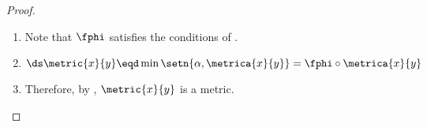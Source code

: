\begin{proof}
\begin{enumerate}
  \item Note that $\fphi$ satisfies the conditions of .
  \item $\ds\metric{x}{y}\eqd \min\setn{\alpha,\metrica{x}{y}}=\fphi\circ\metrica{x}{y}$
  \item Therefore, by , $\metric{x}{y}$ is a metric.
\end{enumerate}

\end{proof}

